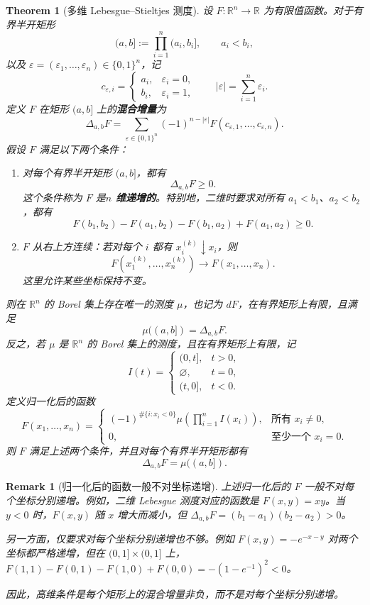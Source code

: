 \documentclass[12pt,letterpaper,twoside,openright]{ctexbook}
\theoremstyle{bluehead}
\newtheorem{theorem}{Theorem}
\theoremstyle{olivehead}
\theoremstyle{orangehead}
\theoremstyle{redremark}
\newtheorem*{remark}{Remark}
\begin{document}
\begin{theorem}[多维 Lebesgue--Stieltjes 测度]\label{thm:multidimensional-stieltjes}
设 $F:\mathbb{R}^n\to\mathbb{R}$ 为有限值函数。对于有界半开矩形
\[
(a,b]:=\prod_{i=1}^n(a_i,b_i],\qquad a_i<b_i,
\]
以及 $\varepsilon=(\varepsilon_1,\ldots,\varepsilon_n)\in\{0,1\}^n$，记
\[
c_{\varepsilon,i}=
\begin{cases}
a_i,&\varepsilon_i=0,\\
b_i,&\varepsilon_i=1,
\end{cases}
\qquad |\varepsilon|=\sum_{i=1}^n\varepsilon_i.
\]
定义 $F$ 在矩形 $(a,b]$ 上的\textbf{混合增量}为
\[
\Delta_{a,b}F
=\sum_{\varepsilon\in\{0,1\}^n}
(-1)^{n-|\varepsilon|}F(c_{\varepsilon,1},\ldots,c_{\varepsilon,n}).
\]
假设 $F$ 满足以下两个条件：
\begin{enumerate}
\item[(1)] 对每个有界半开矩形 $(a,b]$，都有
\[
\Delta_{a,b}F\geq0.
\]
这个条件称为 $F$ 是\textbf{$n$ 维递增的}。特别地，二维时要求对所有 $a_1<b_1$、$a_2<b_2$，都有
\[
F(b_1,b_2)-F(a_1,b_2)-F(b_1,a_2)+F(a_1,a_2)\geq0.
\]
\item[(2)] $F$ 从右上方连续：若对每个 $i$ 都有 $x_i^{(k)}\downarrow x_i$，则
\[
F(x_1^{(k)},\ldots,x_n^{(k)})\longrightarrow F(x_1,\ldots,x_n).
\]
这里允许某些坐标保持不变。
\end{enumerate}
则在 $\mathbb{R}^n$ 的 Borel 集上存在唯一的测度 $\mu$，也记为 $dF$，在有界矩形上有限，且满足
\[
\boxed{\mu((a,b])=\Delta_{a,b}F.}
\]
反之，若 $\mu$ 是 $\mathbb{R}^n$ 的 Borel 集上的测度，且在有界矩形上有限，记
\[
I(t)=
\begin{cases}
(0,t],&t>0,\\
\varnothing,&t=0,\\
(t,0],&t<0.
\end{cases}
\]
定义归一化后的函数
\[
F(x_1,\ldots,x_n)=
\begin{cases}
(-1)^{\#\{i:x_i<0\}}\displaystyle\mu\!\left(\prod_{i=1}^n I(x_i)\right),
&\text{所有 }x_i\ne0,\\[4pt]
0,&\text{至少一个 }x_i=0.
\end{cases}
\]
则 $F$ 满足上述两个条件，并且对每个有界半开矩形都有
\[
\Delta_{a,b}F=\mu((a,b]).
\]

\end{theorem}

\begin{remark}[归一化后的函数一般不对坐标递增]
上述归一化后的 $F$ 一般不对每个坐标分别递增。例如，二维 Lebesgue 测度对应的函数是 $F(x,y)=xy$。当 $y<0$ 时，$F(x,y)$ 随 $x$ 增大而减小，但 $\Delta_{a,b}F=(b_1-a_1)(b_2-a_2)>0$。

另一方面，仅要求对每个坐标分别递增也不够。例如 $F(x,y)=-e^{-x-y}$ 对两个坐标都严格递增，但在 $(0,1]\times(0,1]$ 上，$F(1,1)-F(0,1)-F(1,0)+F(0,0)=-(1-e^{-1})^2<0$。

因此，高维条件是每个矩形上的混合增量非负，而不是对每个坐标分别递增。
\end{remark}
\end{document}
